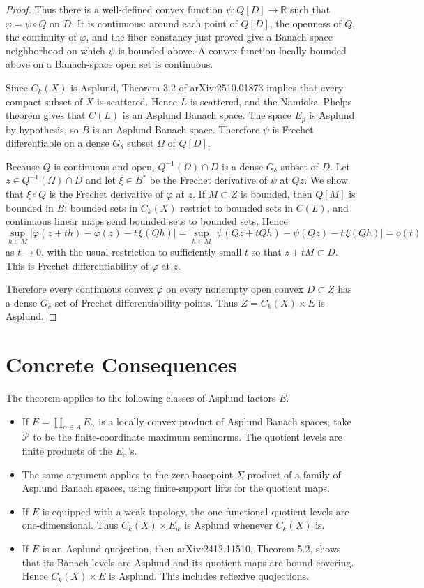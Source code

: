 \documentclass[11pt]{article}
\newcommand{\R}{\mathbb{R}}
\begin{document}
\begin{proof}
Thus there is a well-defined convex function $\psi:Q[D]\to\R$ such that
$\varphi=\psi\circ Q$ on $D$. It is continuous: around each point of $Q[D]$,
the openness of $Q$, the continuity of $\varphi$, and the fiber-constancy just
proved give a Banach-space neighborhood on which $\psi$ is bounded above. A
convex function locally bounded above on a Banach-space open set is continuous.

Since $C_k(X)$ is Asplund, Theorem 3.2 of arXiv:2510.01873 implies that every
compact subset of $X$ is scattered. Hence $L$ is scattered, and the
Namioka--Phelps theorem gives that $C(L)$ is an Asplund Banach space. The
space $E_p$ is Asplund by hypothesis, so $B$ is an Asplund Banach space.
Therefore $\psi$ is Frechet differentiable on a dense $G_\delta$ subset
$\Omega$ of $Q[D]$.

Because $Q$ is continuous and open, $Q^{-1}(\Omega)\cap D$ is a dense
$G_\delta$ subset of $D$. Let $z\in Q^{-1}(\Omega)\cap D$ and let
$\xi\in B^*$ be the Frechet derivative of $\psi$ at $Qz$. We show that
$\xi\circ Q$ is the Frechet derivative of $\varphi$ at $z$. If $M\subset Z$ is
bounded, then $Q[M]$ is bounded in $B$: bounded sets in $C_k(X)$ restrict to
bounded sets in $C(L)$, and continuous linear maps send bounded sets to
bounded sets. Hence
\[
 \sup_{h\in M}
 \left|
   \varphi(z+th)-\varphi(z)-t\,\xi(Qh)
 \right|
 =
 \sup_{h\in M}
 \left|
   \psi(Qz+tQh)-\psi(Qz)-t\,\xi(Qh)
 \right|
 =o(t)
\]
as $t\to0$, with the usual restriction to sufficiently small $t$ so that
$z+tM\subset D$. This is Frechet differentiability of $\varphi$ at $z$.

Therefore every continuous convex $\varphi$ on every nonempty open convex
$D\subset Z$ has a dense $G_\delta$ set of Frechet differentiability points.
Thus $Z=C_k(X)\times E$ is Asplund.
\end{proof}

\section*{Concrete Consequences}

The theorem applies to the following classes of Asplund factors $E$.

\begin{itemize}
\item If $E=\prod_{\alpha\in A}E_\alpha$ is a locally convex product of
Asplund Banach spaces, take $\mathcal P$ to be the finite-coordinate maximum
seminorms. The quotient levels are finite products of the $E_\alpha$'s.
\item The same argument applies to the zero-basepoint $\Sigma$-product of a
family of Asplund Banach spaces, using finite-support lifts for the quotient
maps.
\item If $E$ is equipped with a weak topology, the one-functional quotient
levels are one-dimensional. Thus $C_k(X)\times E_w$ is Asplund whenever
$C_k(X)$ is.
\item If $E$ is an Asplund quojection, then arXiv:2412.11510, Theorem 5.2,
shows that its Banach levels are Asplund and its quotient maps are
bound-covering. Hence $C_k(X)\times E$ is Asplund. This includes reflexive
quojections.
\end{itemize}
\end{document}
